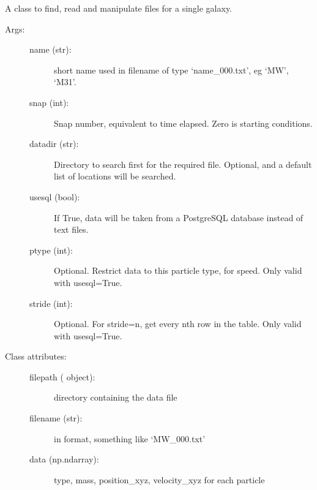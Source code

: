 \documentclass[letterpaper,10pt,english]{sphinxmanual}
\begin{document}
\begin{fulllineitems}
\label{\detokenize{galaxy:galaxy.galaxy.Galaxy}}
A class to find, read and manipulate files for a single galaxy.
\begin{description}
\item[{Args:}] \leavevmode\begin{description}
\item[{name (str):}] \leavevmode
short name used in filename of type ‘name\_000.txt’, eg ‘MW’, ‘M31’.

\item[{snap (int):}] \leavevmode
Snap number, equivalent to time elapsed. Zero is starting conditions.

\item[{datadir (str):}] \leavevmode
Directory to search first for the required file. Optional, and a
default list of locations will be searched.

\item[{usesql (bool):}] \leavevmode
If True, data will be taken from a PostgreSQL database instead of
text files.

\item[{ptype (int):}] \leavevmode
Optional. Restrict data to this particle type, for speed. 
Only valid with usesql=True.

\item[{stride (int):}] \leavevmode
Optional. For stride=n, get every nth row in the table.
Only valid with usesql=True.

\end{description}

\item[{Class attributes:}] \leavevmode\begin{description}
\item[{filepath ( object):}] \leavevmode
directory containing the data file

\item[{filename (str):}] \leavevmode
in  format, something like ‘MW\_000.txt’

\item[{data (np.ndarray):}] \leavevmode
type, mass, position\_xyz, velocity\_xyz for each particle


\end{description}
\end{description}
\end{fulllineitems}
\end{document}
